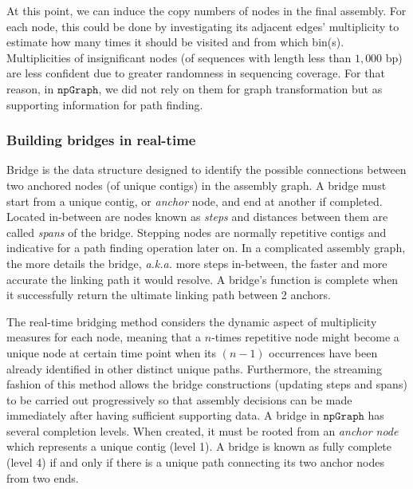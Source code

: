 \documentclass[10pt,letterpaper]{article}
\newcommand{\npgraph}{$\mathtt{npGraph}$}
\begin{document}
At this point, we can induce the copy numbers of nodes in the final assembly.
For each node, this could be done by investigating its adjacent edges' multiplicity to estimate how many times it should be visited and from which bin(s).
Multiplicities of insignificant nodes (of sequences with length less than $1,000$ bp) are less confident due to greater randomness in sequencing coverage. 
For that reason, in \npgraph{}, we did not rely on them for graph transformation but as supporting information for path finding.

\subsubsection*{Building bridges in real-time}
Bridge is the data structure designed to identify the possible connections between two anchored nodes (of unique contigs) in the assembly graph.
A bridge must start from a unique contig, or \emph{anchor} node, and end at another if completed. Located in-between are nodes known as \emph{steps} and distances between them are called \emph{spans} of the bridge. Stepping nodes are normally repetitive contigs and indicative for a path finding operation later on. In a complicated assembly graph, the more details the bridge, \emph{a.k.a.} more steps in-between, the faster and more accurate the linking path it would resolve. A bridge's function is complete when it successfully return the ultimate linking path between 2 anchors.

The real-time bridging method considers the dynamic aspect of multiplicity measures for each node, meaning that a $n$-times repetitive node might become a unique node at certain time point when its $(n-1)$ occurrences have been already identified in other distinct unique paths. 
Furthermore, the streaming fashion of this method allows the bridge constructions (updating steps and spans) to be carried out progressively so that assembly decisions can be made immediately after having sufficient supporting data.
A bridge in \npgraph{} has several completion levels. When created, it must be rooted from an \emph{anchor node} which represents a unique contig (level 1). A bridge is known as fully complete (level 4) if and only if there is a unique path connecting its two anchor nodes from two ends. 
\end{document}

